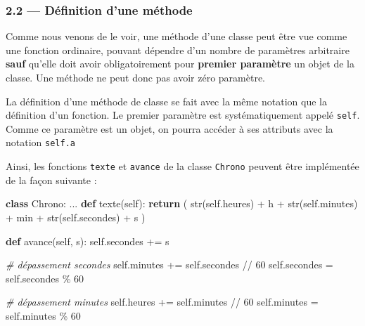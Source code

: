 \documentclass[a4paper,17pt]{extarticle}
\newenvironment{Shaded}{}{}
\newcommand{\KeywordTok}[1]{\textcolor[rgb]{0.00,0.44,0.13}{\textbf{{#1}}}}
\newcommand{\DecValTok}[1]{\textcolor[rgb]{0.25,0.63,0.44}{{#1}}}
\newcommand{\StringTok}[1]{\textcolor[rgb]{0.25,0.44,0.63}{{#1}}}
\newcommand{\CommentTok}[1]{\textcolor[rgb]{0.38,0.63,0.69}{\textit{{#1}}}}
\newcommand{\NormalTok}[1]{{#1}}
\newcommand{\VariableTok}[1]{\textcolor[rgb]{0.10,0.09,0.49}{{#1}}}
\newcommand{\ControlFlowTok}[1]{\textcolor[rgb]{0.00,0.44,0.13}{\textbf{{#1}}}}
\newcommand{\OperatorTok}[1]{\textcolor[rgb]{0.40,0.40,0.40}{{#1}}}
\newcommand{\BuiltInTok}[1]{{#1}}
\begin{document}
    \hypertarget{duxe9finition-dune-muxe9thode}{%
\subsubsection{2.2 --- Définition d'une
méthode}\label{duxe9finition-dune-muxe9thode}}

    Comme nous venons de le voir, une méthode d'une classe peut être vue
comme une fonction ordinaire, pouvant dépendre d'un nombre de paramètres
arbitraire \textbf{sauf} qu'elle doit avoir obligatoirement pour
\textbf{premier paramètre} un objet de la classe. Une méthode ne peut
donc pas avoir zéro paramètre.

La définition d'une méthode de classe se fait avec la même notation que
la définition d'un fonction. Le premier paramètre est systématiquement
appelé \texttt{self}. Comme ce paramètre est un objet, on pourra accéder
à ses attributs avec la notation \texttt{self.a}
\begin{exemple}
    Ainsi, les fonctions \texttt{texte} et \texttt{avance} de la classe
\texttt{Chrono} peuvent être implémentée de la façon suivante :

\begin{Shaded}
\begin{Highlighting}[]
\KeywordTok{class}\NormalTok{ Chrono:}
\NormalTok{    ...}
    \KeywordTok{def}\NormalTok{ texte(}\VariableTok{self}\NormalTok{):}
        \ControlFlowTok{return}\NormalTok{ (  }\BuiltInTok{str}\NormalTok{(}\VariableTok{self}\NormalTok{.heures)   }\OperatorTok{+} \StringTok{\textquotesingle{}h \textquotesingle{}}
                \OperatorTok{+} \BuiltInTok{str}\NormalTok{(}\VariableTok{self}\NormalTok{.minutes)  }\OperatorTok{+} \StringTok{\textquotesingle{}min \textquotesingle{}}
                \OperatorTok{+} \BuiltInTok{str}\NormalTok{(}\VariableTok{self}\NormalTok{.secondes) }\OperatorTok{+} \StringTok{\textquotesingle{}s\textquotesingle{}}\NormalTok{   )}

    \KeywordTok{def}\NormalTok{ avance(}\VariableTok{self}\NormalTok{, s):}
        \VariableTok{self}\NormalTok{.secondes }\OperatorTok{+=}\NormalTok{ s}
        
        \CommentTok{\# dépassement secondes}
        \VariableTok{self}\NormalTok{.minutes }\OperatorTok{+=} \VariableTok{self}\NormalTok{.secondes }\OperatorTok{//} \DecValTok{60}
        \VariableTok{self}\NormalTok{.secondes }\OperatorTok{=} \VariableTok{self}\NormalTok{.secondes }\OperatorTok{\%}  \DecValTok{60}

        \CommentTok{\# dépassement minutes}
        \VariableTok{self}\NormalTok{.heures }\OperatorTok{+=} \VariableTok{self}\NormalTok{.minutes }\OperatorTok{//} \DecValTok{60}
        \VariableTok{self}\NormalTok{.minutes }\OperatorTok{=} \VariableTok{self}\NormalTok{.minutes }\OperatorTok{\%}  \DecValTok{60}
\end{Highlighting}
\end{Shaded}

        \end{exemple}
\end{document}

